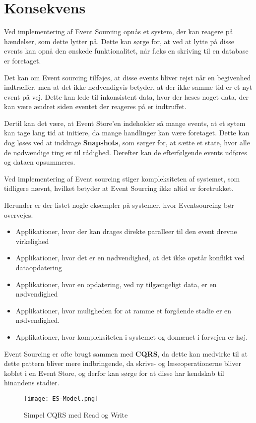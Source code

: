 \section{Konsekvens}
Ved implementering af Event Sourcing opnås et system, der kan reagere på hændelser, som dette lytter på. Dette kan sørge for, at ved at lytte på disse events kan opnå den ønskede funktionalitet, når f.eks en skriving til en database er foretaget.

Det kan om Event sourcing tilføjes, at disse events bliver rejst når en begivenhed indtræffer, men at det ikke nødvendigvis betyder, at der ikke samme tid er et nyt event på vej. Dette kan lede til inkonsistent data, hvor der læses noget data, der kan være ændret siden eventet der reageres på er indtruffet.

Dertil kan det være, at Event Store'en indeholder så mange events, at et sytem kan tage lang tid at initiere, da mange handlinger kan være foretaget. Dette kan dog løses ved at inddrage \textbf{Snapshots}, som sørger for, at sætte et state, hvor alle de nødvændige ting er til rådighed. Derefter kan de efterfølgende events udføres og dataen opsummeres.

Ved implementering af Event sourcing stiger kompleksiteten af systemet, som tidligere nævnt, hvilket betyder at Event Sourcing ikke altid er foretrukket. 

Herunder er der listet nogle eksempler på systemer, hvor Eventsourcing bør overvejes.
\begin{itemize}
	\item Applikationer, hvor der kan drages direkte paralleer til den event drevne virkelighed
	\item Applikationer, hvor det er en nødvendighed, at det ikke opstår konflikt ved dataopdatering 
	\item Applikationer, hvor en opdatering, ved ny tilgængeligt data, er en nødvendighed
	\item Applikationer, hvor muligheden for at ramme et forgående stadie er en nødvendighed.
	\item Applikationer, hvor kompleksiteten i systemet og domænet i forvejen er høj.
\end{itemize}

Event Sourcing er ofte brugt sammen med \textbf{CQRS}, da dette kan medvirke til at dette pattern bliver mere indbringende, da skrive- og læseoperationerne bliver koblet i en Event Store, og derfor kan sørge for at disse har kendskab til hinandens stadier.

\begin{figure}[H]
	\center
	\texttt{[image: ES-Model.png]}
	\caption{Simpel CQRS med Read og Write}
	\label{fig:cqrs-ES_model}
\end{figure}

